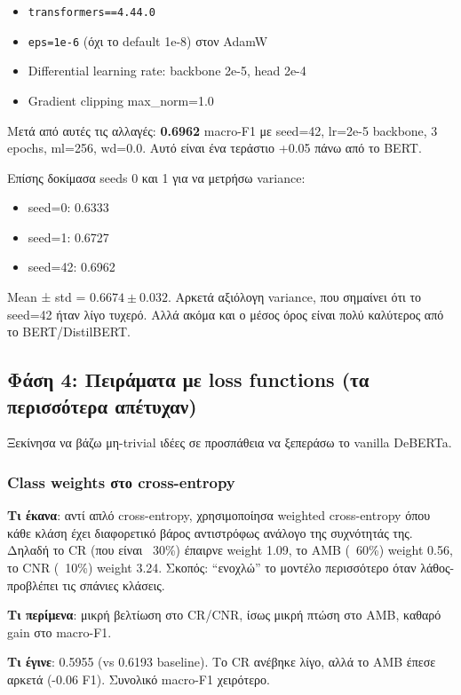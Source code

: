 \documentclass[12pt]{fphw}
\begin{document}
\begin{itemize}
    \item \texttt{transformers==4.44.0}
    \item \texttt{eps=1e-6} (όχι το default 1e-8) στον AdamW
    \item Differential learning rate: backbone 2e-5, head 2e-4
    \item Gradient clipping max\_norm=1.0
\end{itemize}

Μετά από αυτές τις αλλαγές: \textbf{0.6962} macro-F1 με seed=42, lr=2e-5 backbone, 3 epochs, ml=256, wd=0.0. Αυτό είναι ένα τεράστιο +0.05 πάνω από το BERT.

Επίσης δοκίμασα seeds 0 και 1 για να μετρήσω variance:
\begin{itemize}
    \item seed=0: 0.6333
    \item seed=1: 0.6727
    \item seed=42: 0.6962
\end{itemize}

Mean ± std = $0.6674 \pm 0.032$. Αρκετά αξιόλογη variance, που σημαίνει ότι το seed=42 ήταν λίγο τυχερό. Αλλά ακόμα και ο μέσος όρος είναι πολύ καλύτερος από το BERT/DistilBERT.

\subsection{Φάση 4: Πειράματα με loss functions (τα περισσότερα απέτυχαν)}

Ξεκίνησα να βάζω μη-trivial ιδέες σε προσπάθεια να ξεπεράσω το vanilla DeBERTa.

\subsubsection{Class weights στο cross-entropy}

\textbf{Τι έκανα}: αντί απλό cross-entropy, χρησιμοποίησα weighted cross-entropy όπου κάθε κλάση έχει διαφορετικό βάρος αντιστρόφως ανάλογο της συχνότητάς της. Δηλαδή το CR (που είναι ~30\%) έπαιρνε weight 1.09, το AMB (~60\%) weight 0.56, το CNR (~10\%) weight 3.24. Σκοπός: ``ενοχλώ'' το μοντέλο περισσότερο όταν λάθος-προβλέπει τις σπάνιες κλάσεις.

\textbf{Τι περίμενα}: μικρή βελτίωση στο CR/CNR, ίσως μικρή πτώση στο AMB, καθαρό gain στο macro-F1.

\textbf{Τι έγινε}: 0.5955 (vs 0.6193 baseline). Το CR ανέβηκε λίγο, αλλά το AMB έπεσε αρκετά (-0.06 F1). Συνολικό macro-F1 χειρότερο.
\end{document}
